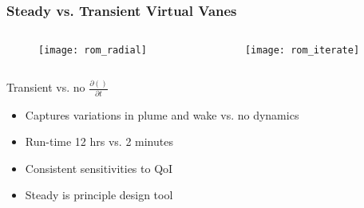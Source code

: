 \documentclass[mathserif]{beamer}
\begin{document}
%
%
\begin{frame}
 \frametitle{Steady vs. Transient Virtual Vanes}

 \begin{columns}[]
  \begin{column}{0.5\linewidth}

    \begin{figure}[htb]
     \centering
     \texttt{[image: rom\_radial]}
    \end{figure}

    \end{column}
  \begin{column}{0.5\linewidth}

    \begin{figure}[htb]
     \centering
     \texttt{[image: rom\_iterate]}
    \end{figure}

  \end{column}
 \end{columns}

 \begin{block}{Transient vs. no $\frac{\partial ()}{\partial t}$}
   \begin{itemize}
   \item Captures variations in plume and wake vs. no dynamics
   \item Run-time 12 hrs vs. 2 minutes
   \item Consistent sensitivities to QoI	
   \item Steady is principle design tool
   \end{itemize}
 \end{block}
 
\end{frame}
\end{document}
